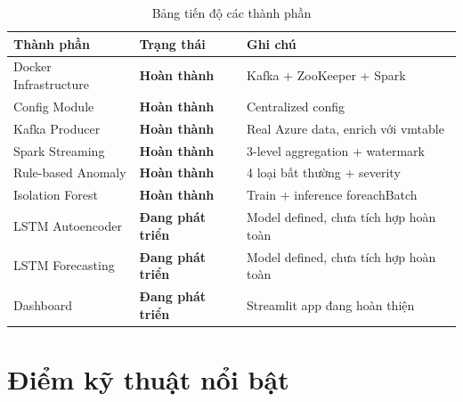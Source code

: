 \documentclass[12pt,a4paper]{article}
\begin{document}
\begin{table}[H]
\centering
\begin{tabularx}{\linewidth}{l l X}
\toprule
\textbf{Thành phần} & \textbf{Trạng thái} & \textbf{Ghi chú} \\
\midrule
Docker Infrastructure & \textcolor{mlgreen}{\textbf{Hoàn thành}} & Kafka + ZooKeeper + Spark \\
Config Module & \textcolor{mlgreen}{\textbf{Hoàn thành}} & Centralized config \\
Kafka Producer & \textcolor{mlgreen}{\textbf{Hoàn thành}} & Real Azure data, enrich với vmtable \\
Spark Streaming & \textcolor{mlgreen}{\textbf{Hoàn thành}} & 3-level aggregation + watermark \\
Rule-based Anomaly & \textcolor{mlgreen}{\textbf{Hoàn thành}} & 4 loại bất thường + severity \\
Isolation Forest & \textcolor{mlgreen}{\textbf{Hoàn thành}} & Train + inference foreachBatch \\
LSTM Autoencoder & \textcolor{kafkaorange}{\textbf{Đang phát triển}} & Model defined, chưa tích hợp hoàn toàn \\
LSTM Forecasting & \textcolor{kafkaorange}{\textbf{Đang phát triển}} & Model defined, chưa tích hợp hoàn toàn \\
Dashboard & \textcolor{kafkaorange}{\textbf{Đang phát triển}} & Streamlit app đang hoàn thiện \\
\bottomrule
\end{tabularx}
\caption{Bảng tiến độ các thành phần}
\end{table}

\section{Điểm kỹ thuật nổi bật}
\end{document}
